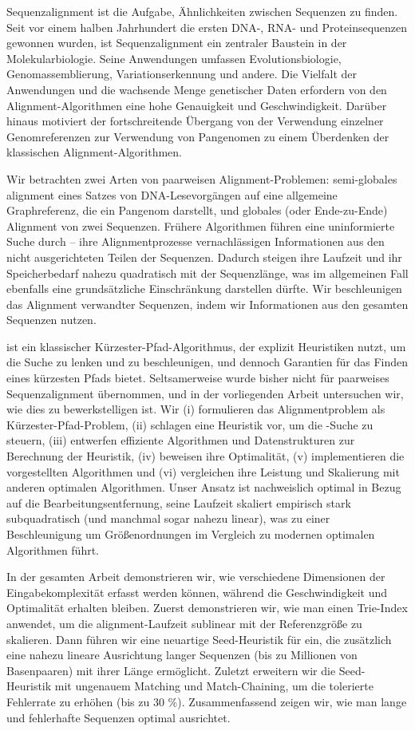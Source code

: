 Sequenzalignment ist die Aufgabe, Ähnlichkeiten zwischen Sequenzen zu finden.
Seit vor einem halben Jahrhundert die ersten DNA-, RNA- und Proteinsequenzen
gewonnen wurden, ist Sequenzalignment ein zentraler Baustein in der
Molekularbiologie. Seine Anwendungen umfassen Evolutionsbiologie,
Genomassemblierung, Variationserkennung und andere. Die Vielfalt der Anwendungen
und die wachsende Menge genetischer Daten erfordern von den
Alignment-Algorithmen eine hohe Genauigkeit und Geschwindigkeit. Darüber hinaus
motiviert der fortschreitende Übergang von der Verwendung einzelner
Genomreferenzen zur Verwendung von Pangenomen zu einem Überdenken der
klassischen Alignment-Algorithmen.

Wir betrachten zwei Arten von paarweisen Alignment-Problemen: semi-globales
alignment eines Satzes von DNA-Lesevorgängen auf eine allgemeine Graphreferenz,
die ein Pangenom darstellt, und globales (oder Ende-zu-Ende) Alignment von zwei
Sequenzen. Frühere Algorithmen führen eine uninformierte Suche durch – ihre
Alignmentprozesse vernachlässigen Informationen aus den nicht ausgerichteten
Teilen der Sequenzen. Dadurch steigen ihre Laufzeit und ihr Speicherbedarf
nahezu quadratisch mit der Sequenzlänge, was im allgemeinen Fall ebenfalls eine
grundsätzliche Einschränkung darstellen dürfte. Wir beschleunigen das Alignment
verwandter Sequenzen, indem wir Informationen aus den gesamten Sequenzen nutzen.

\A ist ein klassischer Kürzester-Pfad-Algorithmus, der explizit Heuristiken
nutzt, um die Suche zu lenken und zu beschleunigen, und dennoch Garantien für
das Finden eines kürzesten Pfads bietet. Seltsamerweise wurde \A bisher nicht
für paarweises Sequenzalignment übernommen, und in der vorliegenden Arbeit
untersuchen wir, wie dies zu bewerkstelligen ist. Wir (i) formulieren das
Alignmentproblem als Kürzester-Pfad-Problem, (ii) schlagen eine Heuristik vor,
um die \A-Suche zu steuern, (iii) entwerfen effiziente Algorithmen und
Datenstrukturen zur Berechnung der Heuristik, (iv) beweisen ihre Optimalität,
(v) implementieren die vorgestellten Algorithmen und (vi) vergleichen ihre
Leistung und Skalierung mit anderen optimalen Algorithmen. Unser Ansatz ist
nachweislich optimal in Bezug auf die Bearbeitungsentfernung, seine Laufzeit
skaliert empirisch stark subquadratisch (und manchmal sogar nahezu linear), was
zu einer Beschleunigung um Größenordnungen im Vergleich zu modernen optimalen
Algorithmen führt.

In der gesamten Arbeit demonstrieren wir, wie verschiedene Dimensionen der
Eingabekomplexität erfasst werden können, während die Geschwindigkeit und
Optimalität erhalten bleiben. Zuerst demonstrieren wir, wie man einen Trie-Index
anwendet, um die alignment-Laufzeit sublinear mit der Referenzgröße zu skalieren.
Dann führen wir eine neuartige Seed-Heuristik für \A ein, die zusätzlich eine
nahezu lineare Ausrichtung langer Sequenzen (bis zu Millionen von Basenpaaren)
mit ihrer Länge ermöglicht. Zuletzt erweitern wir die Seed-Heuristik mit
ungenauem Matching und Match-Chaining, um die tolerierte Fehlerrate zu erhöhen
(bis zu 30 \%). Zusammenfassend zeigen wir, wie man lange und fehlerhafte
Sequenzen optimal ausrichtet.

